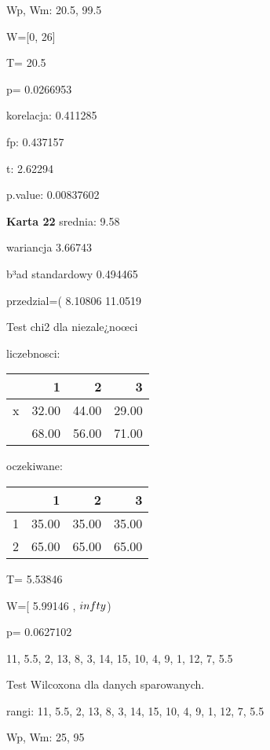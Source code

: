 \documentclass[a4paper,12pt]{article}
\begin{document}
\begin{multicols}{3}
  Wp, Wm:  20.5,  99.5 
  
  W=[0, 26]  
  
  T=  20.5 
  
  p= 0.0266953 \vspace{1cm} 

  korelacja: 0.411285
     
     fp: 0.437157
     
     t: 2.62294
     
     p.value: 0.00837602 \vspace{1cm} 

  \textbf{Karta  22 } 
 srednia: 9.58 
     
     wariancja 3.66743  
     
     b³ad standardowy 0.494465 
     
     przedzial=( 8.10806 11.0519 \vspace{1cm} 

  Test chi2 dla niezale¿noœci 
   
   liczebnosci: %
\begin{tabular}{rrrr}
  \hline
 & 1 & 2 & 3 \\
  \hline
x & 32.00 & 44.00 & 29.00 \\
   & 68.00 & 56.00 & 71.00 \\
   \hline
\end{tabular}
 
   
   oczekiwane: %
\begin{tabular}{rrrr}
  \hline
 & 1 & 2 & 3 \\
  \hline
1 & 35.00 & 35.00 & 35.00 \\
  2 & 65.00 & 65.00 & 65.00 \\
   \hline
\end{tabular}
 
   
   T= 5.53846 
   
   W=[ 5.99146 , $\\infty$) 
   
   p= 0.0627102 \vspace{1cm} 

  11, 5.5, 2, 13, 8, 3, 14, 15, 10, 4, 9, 1, 12, 7, 5.5 

  Test Wilcoxona dla danych sparowanych. 
  
  rangi: 11, 5.5, 2, 13, 8, 3, 14, 15, 10, 4, 9, 1, 12, 7, 5.5 
  
  Wp, Wm:  25,  95 
  

\end{multicols}
\end{document}
